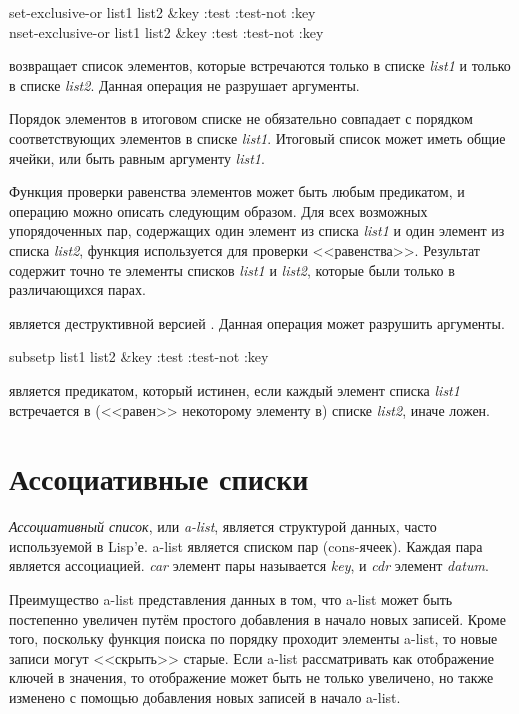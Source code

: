 \begin{defun}[Функция]
set-exclusive-or list1 list2 &key :test :test-not :key \\
nset-exclusive-or list1 list2 &key :test :test-not :key

 возвращает список элементов, которые встречаются только в
списке \emph{list1} и только в списке \emph{list2}.
Данная операция не разрушает аргументы.

Порядок элементов в итоговом списке не обязательно совпадает с порядком
соответствующих элементов в списке \emph{list1}.
Итоговый список может иметь общие ячейки, или быть равным  аргументу
\emph{list1}.

Функция проверки равенства элементов может быть любым предикатом, и операцию
 можно описать следующим образом. Для всех возможных
упорядоченных пар, содержащих один элемент из списка \emph{list1} и один элемент
из списка \emph{list2}, функция используется для проверки
<<равенства>>. Результат содержит точно те элементы списков \emph{list1} и
\emph{list2}, которые были только в различающихся парах.

 является деструктивной версией
. Данная операция может разрушить аргументы.
\end{defun}

\begin{defun}[Функция]
subsetp list1 list2 &key :test :test-not :key

 является предикатом, который истинен, если каждый элемент списка
\emph{list1} встречается в (<<равен>> некоторому элементу в) списке
\emph{list2}, иначе ложен.
\end{defun}

\section{Ассоциативные списки}

\emph{Ассоциативный список}, или \emph{a-list}, является структурой данных,
часто используемой в Lisp'е. a-list является списком пар (cons-ячеек). Каждая
пара является ассоциацией. \emph{car} элемент пары называется \emph{key}, и
\emph{cdr} элемент \emph{datum}.

Преимущество a-list представления данных в том, что a-list может быть
постепенно увеличен путём простого добавления в начало новых записей.
Кроме того, поскольку функция поиска  по порядку проходит элементы
a-list, то новые записи могут <<скрыть>> старые. Если a-list
рассматривать как отображение ключей в значения, то отображение может быть не
только увеличено, но также изменено с помощью добавления новых записей в начало
a-list.

